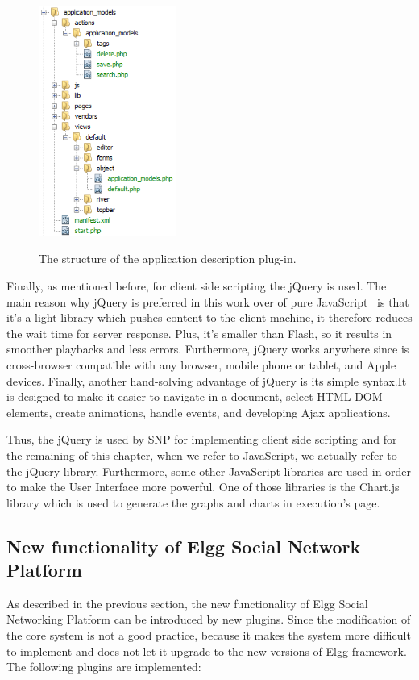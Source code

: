 \begin{figure}[h]
	\caption{The structure of the application description plug-in.}
	\includegraphics[width=0.4\textwidth]{./fig/folder_hierarchy.png}
	\centering
	\label{fig:elgg_hierarchy}
\end{figure}

Finally, as mentioned before, for client side scripting the jQuery is used. The main reason why jQuery is preferred in this work over of pure JavaScript~\cite{mccormick2004jquery} is that it's a light library which pushes content to the client machine, it therefore reduces the wait time for server response. Plus, it's smaller than Flash, so it results in smoother playbacks and less errors. Furthermore, jQuery works anywhere since is cross-browser compatible with any browser, mobile phone or tablet, and Apple devices. Finally, another hand-solving advantage of jQuery is its simple syntax.It is designed to make it easier to navigate in a document, select HTML DOM elements, create animations, handle events, and developing Ajax applications. 

Thus, the jQuery is used by SNP for implementing client side scripting and for the remaining of this chapter, when we refer to JavaScript, we actually refer to the jQuery library. 
Furthermore, some other JavaScript libraries are used in order to make the User Interface more powerful. One of those libraries is the Chart.js~\cite{chartjs_url} library which is used to generate the graphs and charts in execution's page.

\subsection{New functionality of Elgg Social Network Platform}
As described in the previous section, the new functionality of Elgg Social Networking Platform can be introduced by new plugins. Since the modification of the core system is not a good practice, because it makes the system more difficult to implement and does not let it upgrade to the new versions of Elgg framework. The following plugins are implemented:

